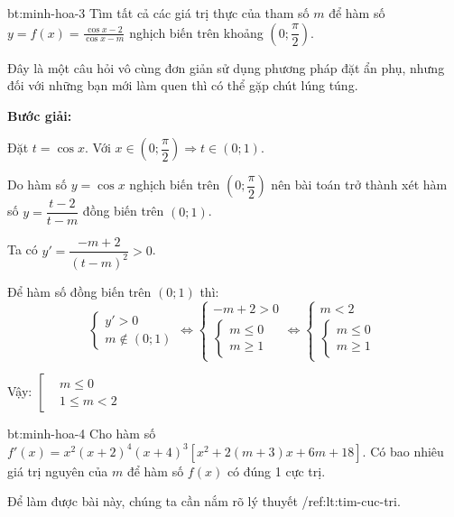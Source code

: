 \begin{cauhoi}{bt:minh-hoa-3}
    Tìm tất cả các giá trị thực của tham số $m$ để hàm số $y= f(x) = \frac{\cos x - 2}{\cos x - m}$ nghịch biến trên khoảng $(0; \dfrac{\pi}{2})$.
\end{cauhoi}

\begin{loigiai}
    Đây là một câu hỏi vô cùng đơn giản sử dụng phương pháp đặt ẩn phụ, nhưng đối với những bạn mới làm quen thì có thể gặp chút lúng túng.
    
    \textbf{Bước giải:}
    
    Đặt $t = \cos x$. Với $x \in \left(0; \dfrac{\pi}{2}\right) \Rightarrow t \in (0; 1)$.
    
    Do hàm số $y = \cos x$ nghịch biến trên $\left(0; \dfrac{\pi}{2}\right)$ nên bài toán trở thành xét hàm số $y = \dfrac{t - 2}{t - m}$ đồng biến trên $(0; 1)$.
    
    Ta có $y' = \dfrac{-m + 2}{(t - m)^2} > 0$.
    
    Để hàm số đồng biến trên $(0; 1)$ thì:
    \[
        \begin{cases}
            y' > 0 \\
            m \notin (0; 1)
        \end{cases}
        \Leftrightarrow
        \begin{cases}
            -m + 2 > 0 \\
            \begin{cases}
                m \leq 0 \\
                m \geq 1
            \end{cases}
        \end{cases}
        \Leftrightarrow
        \begin{cases}
            m < 2 \\
            \begin{cases}
                m \leq 0 \\
                m \geq 1
            \end{cases}
        \end{cases}
    \]

    Vậy:
    $
        \left[
        \begin{aligned}
            &m \leq 0 \\
            &1 \leq m < 2
        \end{aligned}
        \right.
    $
\end{loigiai}

\begin{cauhoi}{bt:minh-hoa-4}
    Cho hàm số $f'(x) = x^2 (x+2)^4 (x+4)^3 [x^2 + 2(m+3)x + 6m + 18]$.
    Có bao nhiêu giá trị nguyên của $m$ để hàm số $f(x)$ có đúng 1 cực trị.
\end{cauhoi}

\begin{loigiai}
    Để làm được bài này, chúng ta cần nắm rõ lý thuyết /ref{:lt:tim-cuc-tri}.

\end{loigiai}